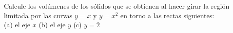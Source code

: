 \item Calcule los volúmenes de los sólidos que se obtienen al hacer girar la región limitada por las curvas $y = x$ y $y = x^2$ en torno a las rectas siguientes:\\
(a) el eje $x$ \qquad (b) el eje $y$ \qquad (c) $y = 2$
